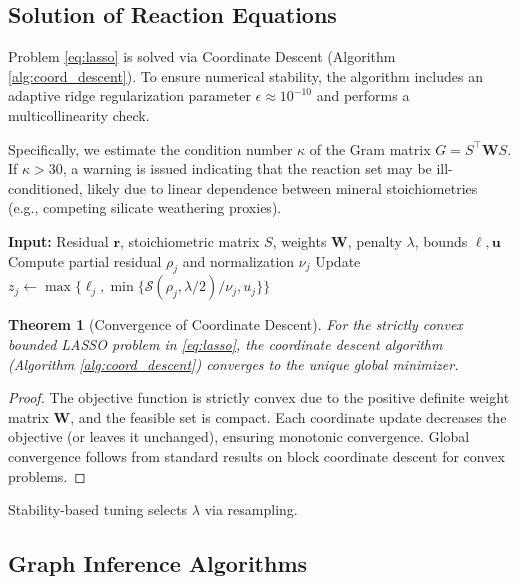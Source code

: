 \documentclass[12pt,a4paper]{article}
\theoremstyle{plain}
\newtheorem{theorem}{Theorem}[section]
\theoremstyle{definition}
\theoremstyle{remark}
\begin{document}
\subsection{Solution of Reaction Equations}\label{sec:solution_reaction}
Problem \eqref{eq:lasso} is solved via Coordinate Descent (Algorithm \ref{alg:coord_descent}). To ensure numerical stability, the algorithm includes an adaptive ridge regularization parameter $\epsilon \approx 10^{-10}$ and performs a multicollinearity check.

Specifically, we estimate the condition number $\kappa$ of the Gram matrix $G = S^\top \mathbf{W} S$. If $\kappa > 30$, a warning is issued indicating that the reaction set may be ill-conditioned, likely due to linear dependence between mineral stoichiometries (e.g., competing silicate weathering proxies).

\begin{algorithm}
	\caption{Coordinate Descent for Bounded LASSO}\label{alg:coord_descent}
	\begin{algorithmic}[1]
		\State \textbf{Input:} Residual $\mathbf{r}$, stoichiometric matrix $S$, weights $\mathbf{W}$, penalty $\lambda$, bounds $\boldsymbol{\ell}, \mathbf{u}$
		\Repeat
		\State Compute partial residual $\rho_j$ and normalization $\nu_j$
		\State Update $z_j \leftarrow \max\{\ell_j, \min\{\mathcal{S}(\rho_j, \lambda/2) / \nu_j, u_j\}\}$
		\EndFor
	\end{algorithmic}
\end{algorithm}

\begin{theorem}[Convergence of Coordinate Descent]\label{thm:cd_convergence}
	For the strictly convex bounded LASSO problem in \eqref{eq:lasso}, the coordinate descent algorithm (Algorithm \ref{alg:coord_descent}) converges to the unique global minimizer.
\end{theorem}

\begin{proof}
	The objective function is strictly convex due to the positive definite weight matrix $\mathbf{W}$, and the feasible set is compact. Each coordinate update decreases the objective (or leaves it unchanged), ensuring monotonic convergence. Global convergence follows from standard results on block coordinate descent for convex problems.
\end{proof}

Stability-based tuning selects $\lambda$ via resampling.

\subsection{Graph Inference Algorithms}\label{sec:graph_algorithms}
\end{document}
